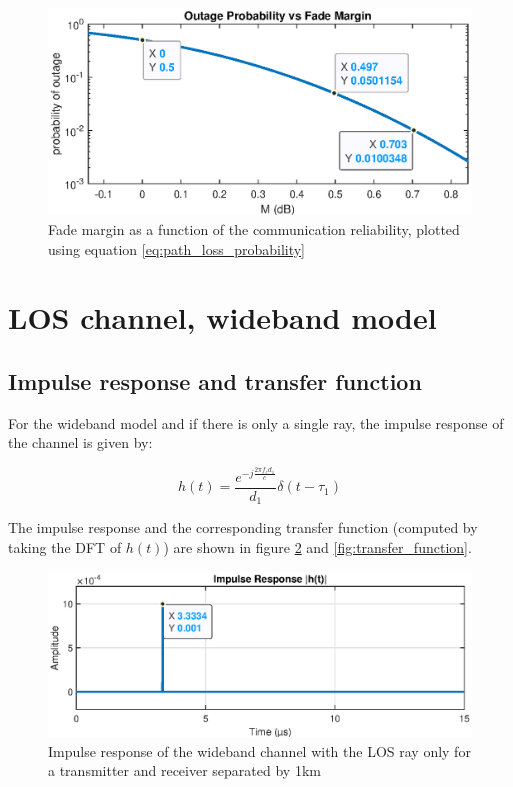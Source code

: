 \documentclass[10pt,a4paper]{ULBreport}
\begin{document}
\begin{figure}[H]
    \centering
    \includegraphics[width=1\textwidth]{3_7.eps}
    \caption{Fade margin as a function of the communication reliability, plotted using equation \ref{eq:path_loss_probability}}
    \label{fig:fade_margin}
\end{figure}

\section{LOS channel, wideband model}
\label{sec:LOS_channel_wideband}

\subsection{Impulse response and transfer function}
For the wideband model and if there is only a single ray, the impulse response of the channel is given by:

\begin{equation*}
    h(t) = \frac{e^{-j \frac{2\pi f_cd_1}{c}}}{d_1} \delta(t - \tau_1)
\end{equation*}

The impulse response and the corresponding transfer function (computed by taking the DFT of $h(t)$) are shown in figure \ref{fig:impulse_response} and \ref{fig:transfer_function}. 

\begin{figure}[H]
    \centering
    \includegraphics[width=1\textwidth]{4_1_temp.eps}
    \caption{Impulse response of the wideband channel with the LOS ray only for a transmitter and receiver separated by 1km} 
    \label{fig:impulse_response}
\end{figure}
\end{document}
